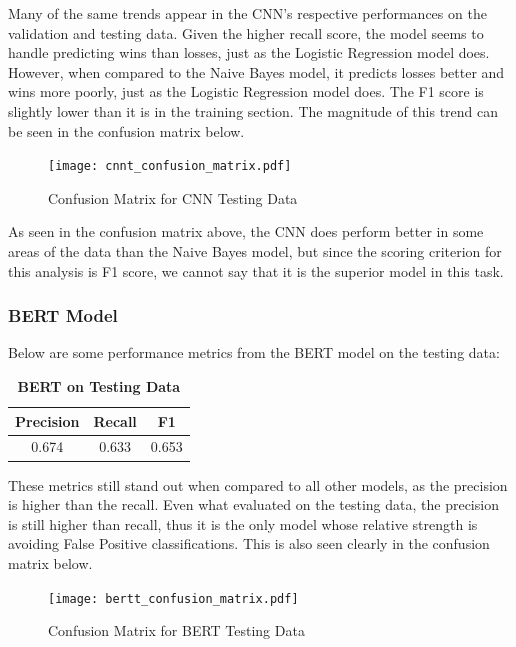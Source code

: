 \documentclass[twocolumn]{article}
\begin{document}
Many of the same trends appear in the CNN's respective performances on the validation and testing data. Given the higher recall score, the model seems to handle predicting wins than losses, just as the Logistic Regression model does. However, when compared to the Naive Bayes model, it predicts losses better and wins more poorly, just as the Logistic Regression model does. The F1 score is slightly lower than it is in the training section. The magnitude of this trend can be seen in the confusion matrix below.

\begin{figure}[H]
    \centering
    \texttt{[image: cnnt\_confusion\_matrix.pdf]}
    \caption{Confusion Matrix for CNN Testing Data}
\end{figure}

As seen in the confusion matrix above, the CNN does perform better in some areas of the data than the Naive Bayes model, but since the scoring criterion for this analysis is F1 score, we cannot say that it is the superior model in this task.

\subsubsection{BERT Model}

Below are some performance metrics from the BERT model on the testing data:

\begin{table}[H]
\centering %
\caption{\textbf{BERT on Testing Data}} 

\begin{tabular}{ccc} 
\toprule
Precision & Recall & F1 \\ 
\midrule
0.674 & 0.633 & 0.653 \\
\bottomrule
\end{tabular}
\end{table}

These metrics still stand out when compared to all other models, as the precision is higher than the recall. Even what evaluated on the testing data, the precision is still higher than recall, thus it is the only model whose relative strength is avoiding False Positive classifications. This is also seen clearly in the confusion matrix below.

\begin{figure}[H]
    \centering
    \texttt{[image: bertt\_confusion\_matrix.pdf]}
    \caption{Confusion Matrix for BERT Testing Data}
\end{figure}
\end{document}
